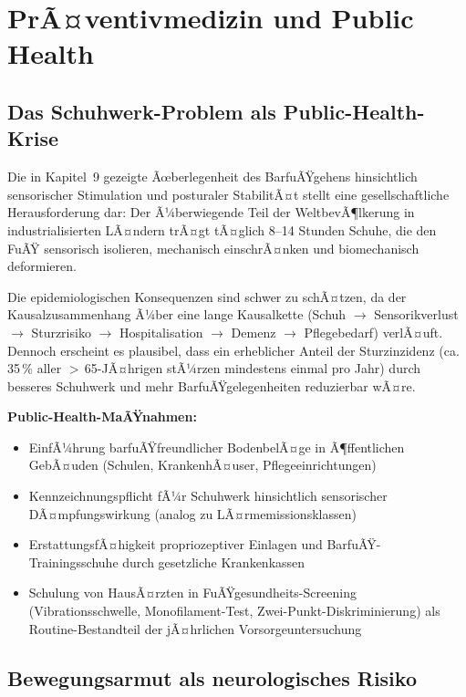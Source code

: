 ﻿\documentclass[12pt,a4paper]{report}
\theoremstyle{plain}
\theoremstyle{definition}
\theoremstyle{remark}
\begin{document}
\section{PrÃ¤ventivmedizin und Public Health}

\subsection{Das Schuhwerk-Problem als Public-Health-Krise}

Die in Kapitel~9 gezeigte Ãœberlegenheit des BarfuÃŸgehens hinsichtlich
sensorischer Stimulation und posturaler StabilitÃ¤t stellt eine
gesellschaftliche Herausforderung dar: Der Ã¼berwiegende Teil der
WeltbevÃ¶lkerung in industrialisierten LÃ¤ndern trÃ¤gt tÃ¤glich
8--14 Stunden Schuhe, die den FuÃŸ sensorisch isolieren, mechanisch
einschrÃ¤nken und biomechanisch deformieren.

Die epidemiologischen Konsequenzen sind schwer zu schÃ¤tzen, da der
Kausalzusammenhang Ã¼ber eine lange Kausalkette (Schuh $\to$
Sensorikverlust $\to$ Sturzrisiko $\to$ Hospitalisation $\to$
Demenz $\to$ Pflegebedarf) verlÃ¤uft. Dennoch erscheint es
plausibel, dass ein erheblicher Anteil der Sturzinzidenz (ca.\,35\,\%
aller $>$\,65-JÃ¤hrigen stÃ¼rzen mindestens einmal pro Jahr) durch
besseres Schuhwerk und mehr BarfuÃŸgelegenheiten reduzierbar wÃ¤re.

\textbf{Public-Health-MaÃŸnahmen:}
\begin{itemize}
\item EinfÃ¼hrung barfuÃŸfreundlicher BodenbelÃ¤ge in Ã¶ffentlichen
  GebÃ¤uden (Schulen, KrankenhÃ¤user, Pflegeeinrichtungen)
\item Kennzeichnungspflicht fÃ¼r Schuhwerk hinsichtlich
  sensorischer DÃ¤mpfungswirkung (analog zu LÃ¤rmemissionsklassen)
\item ErstattungsfÃ¤higkeit propriozeptiver Einlagen und
  BarfuÃŸ-Trainingsschuhe durch gesetzliche Krankenkassen
\item Schulung von HausÃ¤rzten in FuÃŸgesundheits-Screening
  (Vibrationsschwelle, Monofilament-Test, Zwei-Punkt-Diskriminierung)
  als Routine-Bestandteil der jÃ¤hrlichen Vorsorgeuntersuchung
\end{itemize}

\subsection{Bewegungsarmut als neurologisches Risiko}
\end{document}
